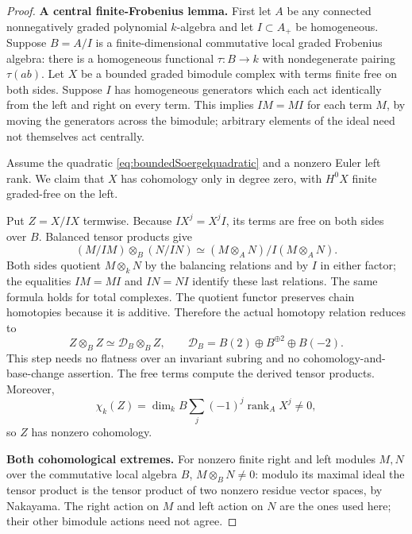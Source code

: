 \documentclass[11pt,a4paper]{article}
\newcommand{\mathscr}{\mathcal}
\theoremstyle{named}\newtheorem{finding}{Finding}[section]
\theoremstyle{definition}\newtheorem{definition}[finding]{Definition}
\theoremstyle{remark}\newtheorem{remark}[finding]{Remark}
\begin{document}
\begin{proof}
\par\smallskip\noindent\textbf{A central finite-Frobenius lemma.}\quad
First let \(A\) be any connected nonnegatively graded polynomial
\(k\)-algebra and let \(I\subset A_+\) be homogeneous. Suppose
\(B=A/I\) is a finite-dimensional commutative local graded
Frobenius algebra: there is a homogeneous functional
\(\tau:B\to k\) with nondegenerate pairing \(\tau(ab)\).
Let \(X\) be a bounded graded bimodule complex with terms finite
free on both sides. Suppose \(I\) has homogeneous generators
which each act identically from the left and right on every term.
This implies \(IM=MI\) for each term \(M\), by moving the
generators across the bimodule; arbitrary elements of the ideal
need not themselves act centrally.

Assume the quadratic
\eqref{eq:boundedSoergelquadratic} and a nonzero Euler left
rank. We claim that \(X\) has cohomology only in degree zero,
with \(H^0X\) finite graded-free on the left.

Put \(Z=X/IX\) termwise. Because \(IX^j=X^jI\), its terms
are free on both sides over \(B\). Balanced tensor products give
\begin{equation}\label{eq:centralquotientmonoidal}
 (M/IM)\otimes_B(N/IN)
 \simeq(M\otimes_A N)/I(M\otimes_A N).
\end{equation}
Both sides quotient \(M\otimes_kN\) by the balancing relations
and by \(I\) in either factor; the equalities \(IM=MI\) and
\(IN=NI\) identify these last relations. The same formula holds
for total complexes. The quotient functor preserves chain
homotopies because it is additive. Therefore the actual
homotopy relation reduces to
\begin{equation}\label{eq:finiteFrobeniusquadratic}
 Z\otimes_B Z\simeq\mathscr D_B\otimes_B Z,
 \qquad\mathscr D_B=B(2)\oplus B^{\oplus2}\oplus B(-2).
\end{equation}
This step needs no flatness over an invariant subring and no
cohomology-and-base-change assertion. The free terms compute
the derived tensor products. Moreover,
\[
 \chi_k(Z)=\dim_kB\sum_j(-1)^j\operatorname{rank}_A X^j\ne0,
\]
so \(Z\) has nonzero cohomology.

\par\smallskip\noindent\textbf{Both cohomological extremes.}\quad
For nonzero finite right and left modules \(M,N\) over the
commutative local algebra \(B\),
\(M\otimes_BN\ne0\): modulo its maximal ideal the tensor
product is the tensor product of two nonzero residue vector
spaces, by Nakayama. The right action on \(M\) and left action
on \(N\) are the ones used here; their other bimodule actions
need not agree.


\end{proof}
\end{document}
